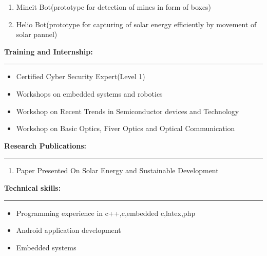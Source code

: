 \documentclass[a4paper,10pt]{article}
\begin{document}
\begin{flushleft}
\begin{enumerate}
      	\item  Mineit Bot(prototype for detection of mines in form of boxes)
      	\item  Helio Bot(prototype for capturing of solar energy efficiently by movement of solar pannel)
      \end{enumerate}
  \textbf{\large Training and Internship:}\\
  \hrule
   \begin{itemize}
   	\item  Certified Cyber Security Expert(Level 1) \\
   	\item  Workshops on embedded systems and robotics\\
   	\item  Workshop on Recent Trends in Semiconductor devices and Technology\\
   	\item  Workshop on Basic Optics, Fiver Optics and Optical Communication\\
   \end{itemize}
   \textbf{\large Research Publications:} \\ 
  \hrule
   \begin{enumerate}
   	\item  Paper Presented On Solar Energy and Sustainable Development \\
   \end{enumerate}
   \textbf{\large Technical skills:}\\
  \hrule
   \begin{itemize}
   	\item  Programming experience in c++,c,embedded c,latex,php \\
   	\item  Android application development\\
   	\item  Embedded systems\\
    \end{itemize}
     \newpage
\end{flushleft}
\end{document}
